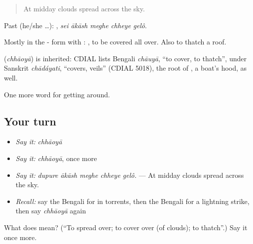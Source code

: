 \begin{quote}
At midday clouds spread across the sky.
\end{quote}

Past (he/she …):     , \emph{sei ākāsh meghe chheye gelô}.

Mostly in the - form with :  , to be covered all over. Also to thatch a roof.

\begin{cousinweb}
\textbf{} (\emph{chhāoyā}) is inherited: CDIAL lists Bengali \emph{chāuyā}, \textquotedblleft{}to cover, to thatch\textquotedblright{}, under Sanskrit \emph{chādáyati}, \textquotedblleft{}covers, veils\textquotedblright{} (CDIAL 5018), the root of , a boat's hood, as well.
\end{cousinweb}

\begin{grammarlens}[title={What you've built}]
One more word for getting around.
\end{grammarlens}

\subsection*{Your turn}
\begin{itemize}
\raggedright
  \item \emph{Say it:} \emph{chhāoyā}
  \item \emph{Say it:} \emph{chhāoyā}, once more
  \item \emph{Say it:} \emph{dupure ākāsh meghe chheye gelô.} — At midday clouds spread across the sky.
  \item \emph{Recall:} say the Bengali for in torrents, then the Bengali for a lightning strike, then say \emph{chhāoyā} again
\end{itemize}

\begin{tcolorbox}[breakable,colback=teal!4,colframe=teal!35!black,title={Before you move on}]
What does  mean? (\textquotedblleft{}To spread over; to cover over (of clouds); to thatch\textquotedblright{}.) Say it once more.
\end{tcolorbox}
